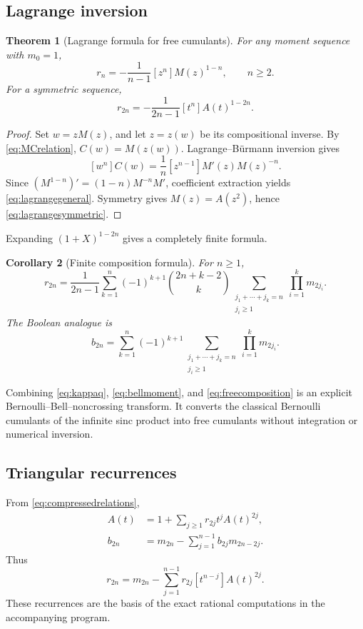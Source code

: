 \documentclass[11pt]{article}
\newtheorem{theorem}{Theorem}[section]
\newtheorem{corollary}[theorem]{Corollary}
\theoremstyle{definition}
\begin{document}
\subsection{Lagrange inversion}
\begin{theorem}[Lagrange formula for free cumulants]\label{thm:lagrangefree}
For any moment sequence with \(m_0=1\),
\begin{equation}\label{eq:lagrangegeneral}
r_n=-\frac1{n-1}[z^n]M(z)^{1-n},\qquad n\ge2.
\end{equation}
For a symmetric sequence,
\begin{equation}\label{eq:lagrangesymmetric}
r_{2n}=-\frac1{2n-1}[t^n]A(t)^{1-2n}.
\end{equation}
\end{theorem}
\begin{proof}
Set \(w=zM(z)\), and let \(z=z(w)\) be its compositional inverse. By \eqref{eq:MCrelation}, \(C(w)=M(z(w))\). Lagrange--B\"urmann inversion gives
\[
[w^n]C(w)=\frac1n[z^{n-1}]M'(z)M(z)^{-n}.
\]
Since \((M^{1-n})'=(1-n)M^{-n}M'\), coefficient extraction yields \eqref{eq:lagrangegeneral}. Symmetry gives \(M(z)=A(z^2)\), hence \eqref{eq:lagrangesymmetric}.
\end{proof}

Expanding \((1+X)^{1-2n}\) gives a completely finite formula.
\begin{corollary}[Finite composition formula]\label{cor:compositionfree}
For \(n\ge1\),
\begin{equation}\label{eq:freecomposition}
r_{2n}=\frac1{2n-1}\sum_{k=1}^n(-1)^{k+1}
\binom{2n+k-2}{k}
\sum_{\substack{j_1+\cdots+j_k=n\\j_i\ge1}}
\prod_{i=1}^k m_{2j_i}.
\end{equation}
The Boolean analogue is
\begin{equation}\label{eq:booleancomposition}
b_{2n}=\sum_{k=1}^n(-1)^{k+1}
\sum_{\substack{j_1+\cdots+j_k=n\\j_i\ge1}}
\prod_{i=1}^k m_{2j_i}.
\end{equation}
\end{corollary}

Combining \eqref{eq:kappaq}, \eqref{eq:bellmoment}, and \eqref{eq:freecomposition} is an explicit Bernoulli--Bell--noncrossing transform. It converts the classical Bernoulli cumulants of the infinite sinc product into free cumulants without integration or numerical inversion.

\subsection{Triangular recurrences}
From \eqref{eq:compressedrelations},
\begin{align}
A(t)&=1+\sum_{j\ge1}r_{2j}t^jA(t)^{2j},\label{eq:freerecgen}\\
b_{2n}&=m_{2n}-\sum_{j=1}^{n-1}b_{2j}m_{2n-2j}.
\label{eq:booleanrec}
\end{align}
Thus
\begin{equation}\label{eq:freerec}
r_{2n}=m_{2n}-\sum_{j=1}^{n-1}r_{2j}[t^{n-j}]A(t)^{2j}.
\end{equation}
These recurrences are the basis of the exact rational computations in the accompanying program.
\end{document}
